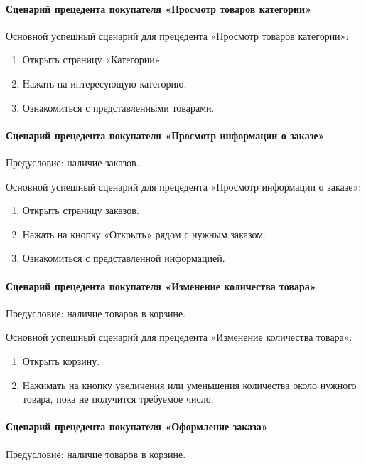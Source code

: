 \paragraph{Сценарий прецедента покупателя «Просмотр товаров категории»}

Основной успешный сценарий для прецедента «Просмотр товаров категории»:
\begin{enumerate}
	\item Открыть страницу «Категории».
	\item Нажать на интересующую категорию.
	\item Ознакомиться с представленными товарами.
\end{enumerate}

\paragraph{Сценарий прецедента покупателя «Просмотр информации о заказе»}
Предусловие: наличие заказов.

Основной успешный сценарий для прецедента «Просмотр информации о заказе»:
\begin{enumerate}
	\item Открыть страницу заказов.
	\item Нажать на кнопку «Открыть» рядом с нужным заказом.
	\item Ознакомиться с представленной информацией.
\end{enumerate}

\paragraph{Сценарий прецедента покупателя «Изменение количества товара»}
Предусловие: наличие товаров в корзине.

Основной успешный сценарий для прецедента «Изменение количества товара»:
\begin{enumerate}
	\item Открыть корзину.
	\item Нажимать на кнопку увеличения или уменьшения количества около нужного товара, пока не получится требуемое число.
\end{enumerate}

\paragraph{Сценарий прецедента покупателя «Оформление заказа»}
Предусловие: наличие товаров в корзине.

